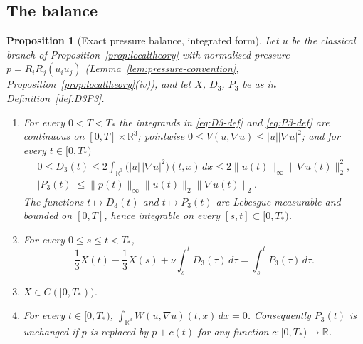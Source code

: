 \documentclass[11pt]{article}
\newtheorem{proposition}[theorem]{Proposition}
\theoremstyle{definition}
\theoremstyle{plain}
\newcommand{\R}{\mathbb R}
\newcommand{\norm}[1]{\lVert #1\rVert}
\begin{document}
\subsection*{The balance}

\begin{proposition}[Exact pressure balance, integrated form]\label{prop:pressure}
Let $u$ be the classical branch of Proposition~\ref{prop:localtheory} with
normalised pressure $p=R_iR_j(u_iu_j)$
(Lemma~\ref{lem:pressure-convention}, Proposition~\ref{prop:localtheory}(iv)),
and let $X$, $D_3$, $P_3$ be as in Definition~\ref{def:D3P3}.
\begin{enumerate}
\item[(i)] For every $0<T<T_*$ the integrands in \eqref{eq:D3-def} and
 \eqref{eq:P3-def} are continuous on $[0,T]\times\R^3$; pointwise
 $0\leq V(u,\nabla u)\leq|u||\nabla u|^2$; and for every $t\in[0,T_*)$
 \begin{equation}\label{eq:D3P3-bounds}
  \begin{gathered}
   0\leq D_3(t)\leq2\int_{\R^3}\bigl(|u|\,|\nabla u|^2\bigr)(t,x)\,dx
   \leq2\norm{u(t)}_\infty\norm{\nabla u(t)}_2^2,\\
   |P_3(t)|\leq\norm{p(t)}_\infty\norm{u(t)}_2\norm{\nabla u(t)}_2 .
  \end{gathered}
 \end{equation}
 The functions $t\mapsto D_3(t)$ and $t\mapsto P_3(t)$ are Lebesgue
 measurable and bounded on $[0,T]$, hence integrable on every
 $[s,t]\subset[0,T_*)$.
\item[(ii)] For every $0\leq s\leq t<T_*$,
 \begin{equation}\label{eq:pressure-balance}
  \frac13X(t)-\frac13X(s)+\nu\int_s^tD_3(\tau)\,d\tau=\int_s^tP_3(\tau)\,d\tau .
 \end{equation}
\item[(iii)] $X\in C([0,T_*))$.
\item[(iv)] For every $t\in[0,T_*)$, $\int_{\R^3}W(u,\nabla u)(t,x)\,dx=0$.
 Consequently $P_3(t)$ is unchanged if $p$ is replaced by $p+c(t)$ for any
 function $c:[0,T_*)\to\R$.
\end{enumerate}
\end{proposition}
\end{document}

